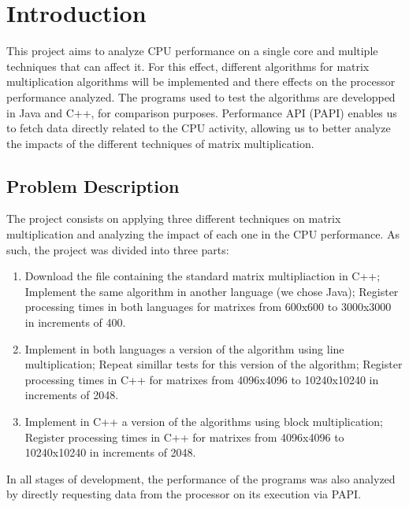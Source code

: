 

\section{Introduction}

This project aims to analyze CPU performance on a single core and multiple techniques that can affect it. For this effect, different algorithms for matrix multiplication algorithms will be implemented and there effects on the processor performance analyzed. The programs used to test the algorithms are developped in Java and C++, for comparison purposes. Performance API (PAPI) enables us to fetch data directly related to the CPU activity, allowing us to better analyze the impacts of the different techniques of matrix multiplication.

\subsection{Problem Description}

The project consists on applying three different techniques on matrix multiplication and analyzing the impact of each one in the CPU performance. As such, the project was divided into three parts:

\begin{enumerate}
    \item Download the file containing the standard matrix multipliaction in C++; Implement the same algorithm in another language (we chose Java); Register processing times in both languages for matrixes from 600x600 to 3000x3000 in increments of 400.
    \item Implement in both languages a version of the algorithm using line multiplication; Repeat simillar tests for this version of the algorithm; Register processing times in C++ for matrixes from 4096x4096 to 10240x10240 in increments of 2048.
    \item Implement in C++ a version of the algorithms using block multiplication; Register processing times in C++ for matrixes from 4096x4096 to 10240x10240 in increments of 2048.
\end{enumerate}

In all stages of development, the performance of the programs was also analyzed by directly requesting data from the processor on its execution via PAPI.